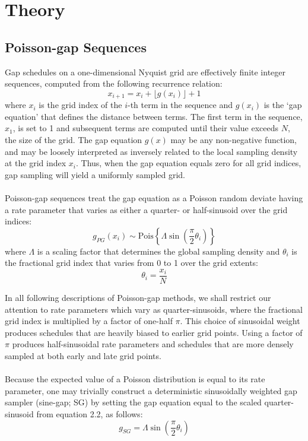 \section{Theory}

\subsection{Poisson-gap Sequences}

\begin{doublespace}
Gap schedules on a one-dimensional Nyquist grid are effectively finite integer
sequences, computed from the following recurrence relation:
\begin{equation}
x_{i+1} = x_i + \lfloor g(x_i) \rfloor + 1
\end{equation}
where $x_i$ is the grid index of the $i$-th term in the sequence and $g(x_i)$
is the `gap equation' that defines the distance between terms. The first term
in the sequence, $x_1$, is set to 1 and subsequent terms are computed until
their value exceeds $N$, the size of the grid. The gap equation $g(x)$ may be
any non-negative function, and may be loosely interpreted as inversely related
to the local sampling density at the grid index $x_i$. Thus, when the gap
equation equals zero for all grid indices, gap sampling will yield a uniformly
sampled grid.
\\\\
Poisson-gap sequences treat the gap equation as a Poisson random deviate
having a rate parameter that varies as either a quarter- or half-sinusoid
over the grid indices:
\begin{equation}
g_{PG}(x_i) \sim \mathrm{Pois} \left\{
 \Lambda \sin \left(
  \frac{\pi}{2} \theta_i
 \right)
\right\}
\end{equation}
where $\Lambda$ is a scaling factor that determines the global sampling
density and $\theta_i$ is the fractional grid index that varies from 0 to 1
over the grid extents:
\begin{equation}
\theta_i = \frac{x_i}{N}
\end{equation}

In all following descriptions of Poisson-gap methods, we shall restrict our
attention to rate parameters which vary as quarter-sinusoids, where the
fractional grid index is multiplied by a factor of one-half $\pi$. This choice
of sinusoidal weight produces schedules that are heavily biased to earlier
grid points. Using a factor of $\pi$ produces half-sinusoidal rate parameters
and schedules that are more densely sampled at both early and late grid points.
\\\\
Because the expected value of a Poisson distribution is equal to its rate
parameter, one may trivially construct a deterministic sinusoidally weighted
gap sampler (sine-gap; SG) by setting the gap equation equal to the scaled
quarter-sinusoid from equation 2.2, as follows:
\begin{equation}
g_{SG} = \Lambda \sin \left( \frac{\pi}{2} \theta_i \right)
\end{equation}


\end{doublespace}
